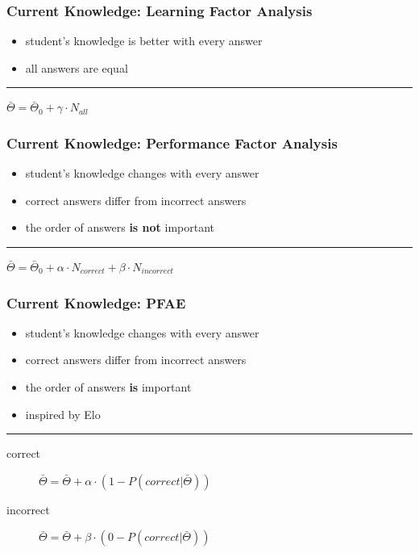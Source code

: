 \documentclass[xcolor=svgnames]{beamer}
\begin{document}
\begin{frame}
	\frametitle{Current Knowledge: Learning Factor Analysis}
	\begin{itemize}
		\item student's knowledge is better with every answer
		\item all answers are equal
	\end{itemize}

	\bigskip

	\hrule

	\begin{center}
		\Large
		$\bar{\Theta} = \bar{\Theta}_0 + \gamma \cdot N_{all}$
	\end{center}
\end{frame}
\begin{frame}
	\frametitle{Current Knowledge: Performance Factor Analysis}
	\begin{itemize}
		\item student's knowledge changes with every answer
		\item correct answers differ from incorrect answers
		\item the order of answers \textbf{is not} important
	\end{itemize}

	\bigskip

	\hrule

	\begin{center}
		\Large
		$\bar{\Theta} = \bar{\Theta}_0 + \alpha \cdot N_{correct} + \beta \cdot N_{incorrect}$
	\end{center}
\end{frame}
\begin{frame}
	\frametitle{Current Knowledge: PFAE}
	\begin{itemize}
		\item student's knowledge changes with every answer
		\item correct answers differ from incorrect answers
		\item the order of answers \textbf{is} important
		\item inspired by Elo
	\end{itemize}

	\bigskip

	\hrule

	\begin{description}
		\item[correct]
			$\bar{\Theta} = \bar{\Theta} + \alpha \cdot \left(1 - P(correct|\bar{\Theta})\right)$
		\item[incorrect]
			$\bar{\Theta} = \bar{\Theta} + \beta \cdot \left(0 - P(correct|\bar{\Theta})\right)$
	\end{description}
\end{frame}
\end{document}
